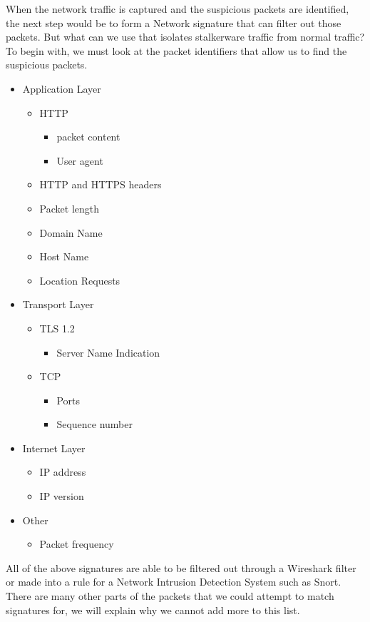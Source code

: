 \documentclass[acmtog]{acmart}
\begin{document}
When the network traffic is captured and the suspicious packets are identified, the next step would be to form a Network signature that can filter out those packets. But what can we use that isolates stalkerware traffic from normal traffic? To begin with, we must look at the packet identifiers that allow us to find the suspicious packets. 
\begin{itemize}
	\item Application Layer
	\begin{itemize}
		\item HTTP
		\begin{itemize}
			\item packet content
			\item User agent
		\end{itemize}
		\item HTTP and HTTPS headers
		\item Packet length
		\item Domain Name
		\item Host Name
		\item Location Requests
	\end{itemize}
	\item Transport Layer
	\begin{itemize}
		\item TLS 1.2
		\begin{itemize}
			\item Server Name Indication
		\end{itemize}
		\item TCP
		\begin{itemize}
			\item Ports
			\item Sequence number
		\end{itemize}
	\end{itemize}
	\item Internet Layer
	\begin{itemize}
		\item IP address
		\item IP version
	\end{itemize}
	\item Other
	\begin{itemize}
		\item Packet frequency
	\end{itemize}
\end{itemize}

All of the above signatures are able to be filtered out through a Wireshark filter or made into a rule for a Network Intrusion Detection System such as Snort. There are many other parts of the packets that we could attempt to match signatures for, we will explain why we cannot add more to this list.
\end{document}
